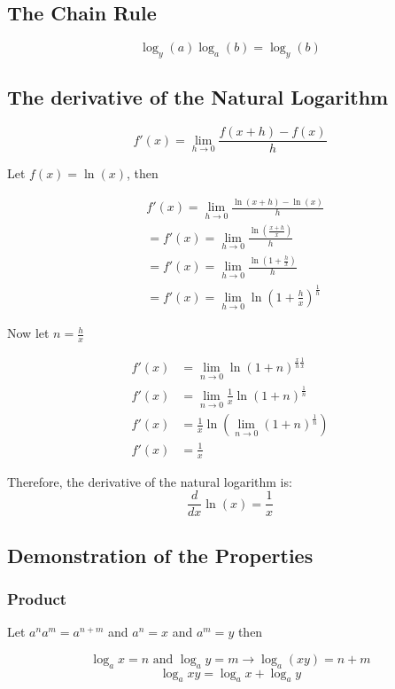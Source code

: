 \subsection{The Chain Rule}
\[
    \log_y(a) \log_a(b) = \log_y(b)
\]

\subsection{The derivative of the Natural Logarithm}

\[
f'(x) = \lim_{h \to 0} \frac{f(x + h) - f(x)}{h}
\]

Let \(f(x) = \ln(x)\), then

\begin{align*}
&f'(x) = \lim_{h \to 0} \frac{\ln(x + h) - \ln(x)}{h}\\
&= f'(x) = \lim_{h \to 0} \frac{\ln\left(\frac{x + h}{x}\right)}{h}\\
&= f'(x) = \lim_{h \to 0} \frac{\ln\left(1 + \frac{h}{x}\right)}{h}\\
&= f'(x) = \lim_{h \to 0} \ln{\left(1 + \frac{h}{x}\right)}^{\frac{1}{h}}
\end{align*}
 
Now let \(n = \frac{h}{x}\)

\begin{align*}
f'(x) &= \lim_{n \to 0} \ln{\left(1 + n\right)}^{\frac{x}{h} \frac{1}{x}}\\
f'(x) &= \lim_{n \to 0} \frac{1}{x} \ln{\left(1 + n\right)}^{\frac{1}{n}}\\
f'(x) &= \frac{1}{x} \ln \left(\lim_{n \to 0} {(1 + n)}^{\frac{1}{n}}\right)\\
f'(x) &= \frac{1}{x}
\end{align*}

Therefore, the derivative of the natural logarithm is:
\[
\frac{d}{dx} \ln(x) = \frac{1}{x}
\]
\QED

\subsection{Demonstration of the Properties}

\subsubsection{Product}

Let \(a^n a^m = a^{n + m}\) and \(a^n = x\) and \(a^m = y\) then

\[
\log_a x = n \text{ and } \log_a y = m \rightarrow \log_a (xy) = n + m
\]
\[
\log_a xy = \log_a x + \log_a y
\]

